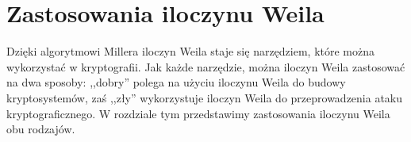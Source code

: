 \chapter{Zastosowania iloczynu Weila}

\noindent
Dzięki algorytmowi Millera iloczyn Weila staje się narzędziem,
które można wykorzystać w kryptografii.
Jak każde narzędzie, można iloczyn Weila zastosować na dwa sposoby:
,,dobry'' polega na użyciu iloczynu Weila do budowy kryptosystemów,
zaś ,,zły'' wykorzystuje iloczyn Weila
do przeprowadzenia ataku kryptograficznego.
W rozdziale tym przedstawimy zastosowania iloczynu Weila obu rodzajów.






